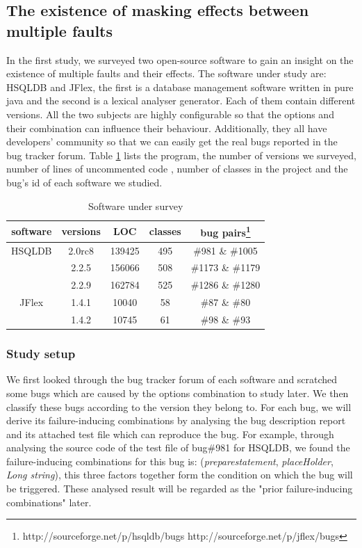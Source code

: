 \documentclass{sig-alternate}
\begin{document}
\subsection{The existence of masking effects between multiple faults}
In the first study, we surveyed two open-source software to gain an insight on the existence of multiple faults and their effects. The software under study are: HSQLDB and JFlex, the first is a database management software written in pure java and the second is a lexical analyser generator. Each of them contain different versions. All the two subjects are highly configurable so that the options and their combination can influence their behaviour. Additionally, they all have developers' community so that we can easily get the real bugs reported in the bug tracker forum. Table \ref{software description} lists the program, the number of versions we surveyed, number of lines of uncommented code , number of classes in the project and the bug's id of each software we studied.

\begin{table}\renewcommand{\arraystretch}{1.3}
\caption{Software under survey}
\label{software description}
\begin{tabular}{c|c|c|c|c} \hline
software & versions & LOC & classes & bug pairs\footnote{ http://sourceforge.net/p/hsqldb/bugs
http://sourceforge.net/p/jflex/bugs  } \\ \hline

HSQLDB  &2.0rc8 & 139425 & 495 &  \#981 \& \#1005\\
	   &2.2.5 & 156066 & 508 & \#1173 \&  \#1179\\
	    &2.2.9 & 162784 &525 & \#1286 \& \#1280\\
JFlex  &1.4.1 &  10040 &58 & \#87 \& \#80 \\
      &1.4.2 &  10745 &61 &  \#98 \& \#93  \\
\hline\end{tabular}
\end{table}



\subsubsection{Study setup}
We first looked through the bug tracker forum of each software and scratched some bugs which are caused by the options combination to study later. We then classify these bugs according to the version they belong to. For each bug, we will derive its failure-inducing combinations by analysing the bug description report and its attached test file which can reproduce the bug. For example, through analysing the source code of the test file of bug\#981 for HSQLDB, we found the failure-inducing combinations for this bug is: (\emph{preparestatement}, \emph{placeHolder}, \emph{Long string}), this three factors together form the condition on which the bug will be triggered. These analysed result will be regarded as the "prior failure-inducing combinations" later.
\end{document}
